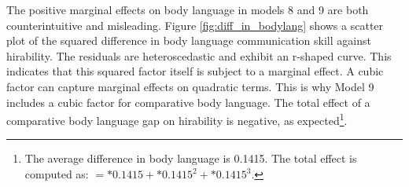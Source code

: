 \documentclass[review]{elsarticle}
\begin{document}



The positive marginal effects on body language in models 8 and 9 are both counterintuitive and misleading.
Figure \ref{fig:diff_in_bodylang} shows a scatter plot of the squared difference in body language communication skill
against hirability.
The residuals are heteroscedastic and exhibit an r-shaped curve.
This indicates that this squared factor itself is subject to a marginal effect.
A cubic factor can capture marginal effects on quadratic terms.
This is why Model 9 includes a cubic factor for comparative body language.
The total effect of a comparative body language gap on hirability is negative, as expected\footnote{
    The average difference in body language is 0.1415. The total effect is computed as: $ = *0.1415 + *0.1415^2 + *0.1415^3$.
}.
\end{document}
